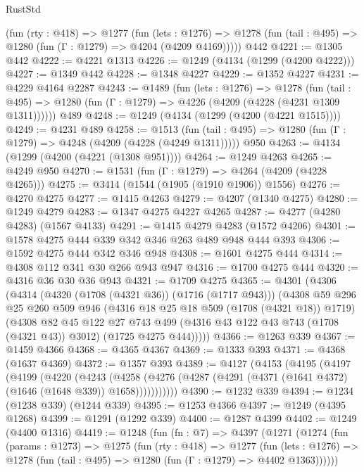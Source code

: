 \begin{lexlean}{RustStd}
\begin{coremodule}
    (fun (rty : @418) =>
    @1277
      (fun (lets : @1276) =>
      @1278 (fun (tail : @495) => @1280 (fun (Γ : @1279) => @4204 (@4209 @4169)))))
    @442
@4221 := @1305 @442
@4222 := @4221 @1313
@4226 := @1249 (@4134 (@1299 (@4200 @4222)))
@4227 := @1349 @442
@4228 := @1348 @4227
@4229 := @1352 @4227
@4231 := @4229 @4164 @2287
@4243 := @1489
    (fun (lets : @1276) =>
    @1278
      (fun (tail : @495) => @1280 (fun (Γ : @1279) => @4226 (@4209 (@4228 (@4231 @1309 @1311))))))
    @489
@4248 := @1249 (@4134 (@1299 (@4200 (@4221 @1515))))
@4249 := @4231 @489
@4258 := @1513
    (fun (tail : @495) => @1280 (fun (Γ : @1279) => @4248 (@4209 (@4228 (@4249 @1311)))))
    @950
@4263 := @4134 (@1299 (@4200 (@4221 (@1308 @951))))
@4264 := @1249 @4263
@4265 := @4249 @950
@4270 := @1531 (fun (Γ : @1279) => @4264 (@4209 (@4228 @4265)))
@4275 := @3414 (@1544 (@1905 (@1910 @1906)) @1556)
@4276 := @4270 @4275
@4277 := @1415 @4263
@4279 := @4207 (@1340 @4275)
@4280 := @1249 @4279
@4283 := @1347 @4275 @4227 @4265
@4287 := @4277 (@4280 @4283) (@1567 @4133)
@4291 := @1415 @4279 @4283 (@1572 @4206)
@4301 := @1578 @4275 @444 @339 @342 @346 @263 @489 @948 @444 @393
@4306 := @1592 @4275 @444 @342 @346 @948
@4308 := @1601 @4275 @444
@4314 := @4308 @112 @341 @30 @266 @943 @947
@4316 := @1700 @4275 @444
@4320 := @4316 @36 @30 @36 @943
@4321 := @1709 @4275
@4365 := @4301
    (@4306
      (@4314
        (@4320 (@1708 (@4321 @36)) (@1716 (@1717 @943)))
        (@4308
          @59
          @296
          @25
          @260
          @509
          @946
          (@4316 @18 @25 @18 @509 (@1708 (@4321 @18)) @1719)
          (@4308
            @82
            @45
            @122
            @27
            @743
            @499
            (@4316 @43 @122 @43 @743 (@1708 (@4321 @43)) @3012)
            (@1725 @4275 @444)))))
@4366 := @1263 @339
@4367 := @1459 @4366
@4368 := @4365 @4367
@4369 := @1333 @393
@4371 := @4368 (@1637 @4369)
@4372 := @1357 @393
@4389 := @4127
    (@4153
      (@4195
        (@4197
          (@4199
            (@4220
              (@4243
                (@4258
                  (@4276 (@4287 (@4291 (@4371 (@1641 @4372) (@1646 (@1648 @339)) @1658)))))))))))
@4390 := @1232 @339
@4394 := @1234 (@1238 @339) (@1244 @339)
@4395 := @1253 @4366
@4397 := @1249 (@4395 @1268)
@4399 := @1291 (@1292 @339)
@4400 := @1287 @4399
@4402 := @1249 (@4400 @1316)
@4419 := @1248
    (fun (fn : @7) =>
    @4397
      (@1271
        (@1274
          (fun (params : @1273) =>
          @1275
            (fun (rty : @418) =>
            @1277
              (fun (lets : @1276) =>
              @1278 (fun (tail : @495) => @1280 (fun (Γ : @1279) => @4402 @1363))))))

\end{coremodule}
\end{lexlean}
